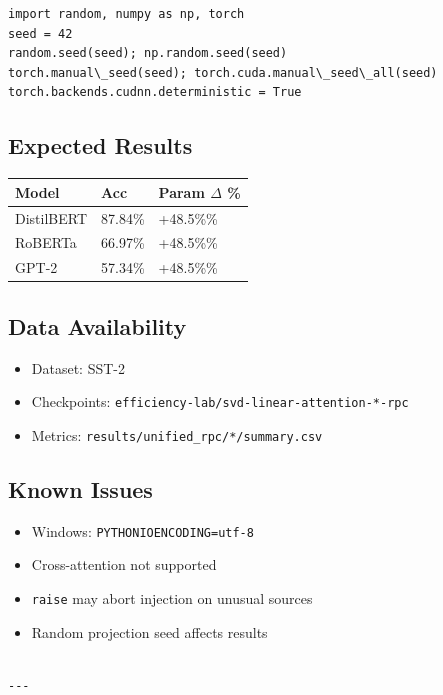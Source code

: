 \begin{lstlisting}
import random, numpy as np, torch
seed = 42
random.seed(seed); np.random.seed(seed)
torch.manual\_seed(seed); torch.cuda.manual\_seed\_all(seed)
torch.backends.cudnn.deterministic = True
\end{lstlisting}

\subsection{Expected Results}

\begin{table}[H]
\centering
\small
\begin{tabular}{lll}
\toprule
\textbf{Model} & \textbf{Acc} & \textbf{Param $\Delta$ \%} \\
\midrule
DistilBERT & 87.84\% & +48.5\%\% \\
RoBERTa & 66.97\% & +48.5\%\% \\
GPT-2 & 57.34\% & +48.5\%\% \\
\bottomrule
\end{tabular}
\end{table}

\subsection{Data Availability}

\begin{itemize}
\item Dataset: SST-2
\item Checkpoints: \texttt{efficiency-lab/svd-linear-attention-*-rpc}
\item Metrics: \texttt{results/unified\_rpc/*/summary.csv}

\end{itemize}
\subsection{Known Issues}

\begin{itemize}
\item Windows: \texttt{PYTHONIOENCODING=utf-8}
\item Cross-attention not supported
\item \texttt{raise} may abort injection on unusual sources
\item Random projection seed affects results
\end{itemize}
\begin{lstlisting}

---
\end{lstlisting}

